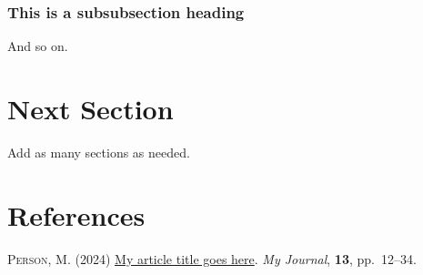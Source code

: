 \documentclass[
]{article}
\newlength{\cslhangindent}
\newenvironment{CSLReferences}[2] %
 {\begin{list}{}{%
  \setlength{\itemindent}{0pt}
  \setlength{\leftmargin}{0pt}
  \setlength{\parsep}{0pt}
  \ifodd #1
   \setlength{\leftmargin}{\cslhangindent}
   \setlength{\itemindent}{-1\cslhangindent}
  \fi
  \setlength{\itemsep}{#2\baselineskip}}}
 {\end{list}}
\begin{document}
\subsubsection{This is a subsubsection
heading}\label{this-is-a-subsubsection-heading}

\lipsum[1-3]

And so on.

\section{Next Section}\label{next-section}

Add as many sections as needed.

\section*{References}\label{references}

\label{refs}
\begin{CSLReferences}{1}{1}
\textsc{Person, M.} (2024) \href{https://doi.org/10.1000/182}{My article
title goes here}. \emph{My Journal}, \textbf{13}, pp.~12--34.

\end{CSLReferences}
\end{document}
